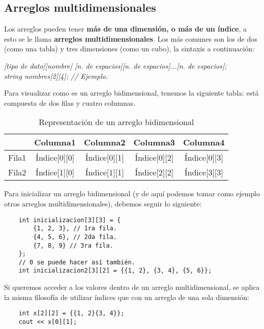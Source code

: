 \subsection{Arreglos multidimensionales}

Los arreglos pueden tener \textbf{más de una dimensión, o más de un índice}, a esto se le llama \textbf{arreglos multidimensionales}. Los más comunes son los de dos (como una tabla) y tres dimensiones (como un cubo), la sintaxis a continuación:
\begin{center}
    \textit{
        [tipo de dato][nombre] [n. de espacios][n. de espacios]...[n. de espacios];\\
        string nombres[2][4]; // Ejemplo.
    }
\end{center}

Para visualizar como es un arreglo bidimensional, tenemos la siguiente tabla: está compuesta de dos filas y cuatro columnas.
\begin{table}[H]
    \begin{center}
        \caption{Representación de un arreglo bidimensional}
        \label{tab: 5}
        \begin{tabular}{|c|c|c|c|c|}
            \hline
            &\textbf{Columna1}&\textbf{Columna2}&\textbf{Columna3}&\textbf{Columna4} \\
            \hline
            Fila1   & Índice[0][0]   & Índice[0][1]   & Índice[0][2]   & Índice[0][3] \\
            \hline
            Fila2   & Índice[1][0]   & Índice[1][1]   & Índice[2][2]   & Índice[3][3] \\
            \hline
        \end{tabular}
    \end{center}
\end{table}

Para inicializar un arreglo bidimensional (y de aquí podemos tomar como ejemplo otros arreglos multidimensionales), debemos seguir lo siguiente:
\begin{lstlisting}
    int inicializacion[3][3] = {
        {1, 2, 3}, // 1ra fila.
        {4, 5, 6}, // 2da fila.
        {7, 8, 9} // 3ra fila.
    };
    // 0 se puede hacer así también.
    int inicializacion2[3][2] = {{1, 2}, {3, 4}, {5, 6}};
\end{lstlisting}

Si queremos acceder a los valores dentro de un arreglo multidimensional, se aplica la misma filosofía de utilizar índices que con un arreglo de una sola dimensión:
\begin{lstlisting}
    int x[2][2] = {{1, 2}{3, 4}};
    cout << x[0][1];
\end{lstlisting}



